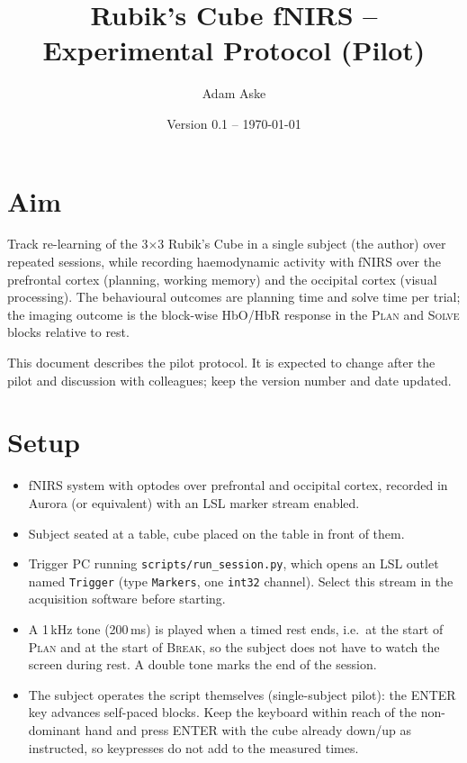 \documentclass[11pt,a4paper]{article}
\title{Rubik's Cube fNIRS -- Experimental Protocol (Pilot)}
\author{Adam Aske}
\date{Version 0.1 -- \today}
\begin{document}
\maketitle

\section{Aim}
Track re-learning of the 3$\times$3 Rubik's Cube in a single subject (the author) over
repeated sessions, while recording haemodynamic activity with fNIRS over the
prefrontal cortex (planning, working memory) and the occipital cortex (visual
processing). The behavioural outcomes are planning time and solve time per
trial; the imaging outcome is the block-wise HbO/HbR response in the
\textsc{Plan} and \textsc{Solve} blocks relative to rest.

This document describes the pilot protocol. It is expected to change after the
pilot and discussion with colleagues; keep the version number and date updated.

\section{Setup}
\begin{itemize}[nosep]
  \item fNIRS system with optodes over prefrontal and occipital cortex, recorded in
        Aurora (or equivalent) with an LSL marker stream enabled.
  \item Subject seated at a table, cube placed on the table in front of them.
  \item Trigger PC running \texttt{scripts/run\_session.py}, which opens an LSL
        outlet named \texttt{Trigger} (type \texttt{Markers}, one \texttt{int32} channel).
        Select this stream in the acquisition software before starting.
  \item A 1\,kHz tone (200\,ms) is played when a timed rest ends, i.e.\ at the start of
        \textsc{Plan} and at the start of \textsc{Break}, so the subject does not have to
        watch the screen during rest. A double tone marks the end of the session.
  \item The subject operates the script themselves (single-subject pilot): the
        ENTER key advances self-paced blocks. Keep the keyboard within reach of
        the non-dominant hand and press ENTER with the cube already down/up as
        instructed, so keypresses do not add to the measured times.
\end{itemize}
\end{document}
